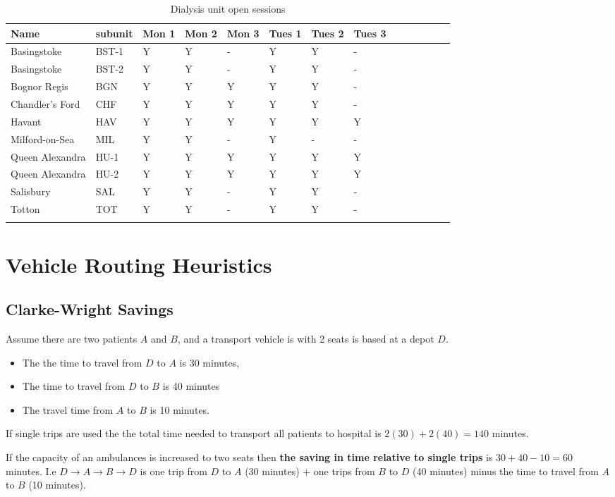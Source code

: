 \begin{appendices}
\begin{minipage}{\textwidth}
\begin{longtable}[]{@{}llllllllllllll@{}}
\caption{Dialysis unit open sessions}\\
\toprule
\endhead
Name & subunit & Mon 1 & Mon 2 & Mon 3 & Tues 1 & Tues 2 & Tues 3\tabularnewline
\midrule
Basingstoke & BST-1 & Y & Y & - & Y & Y & -\tabularnewline
Basingstoke & BST-2 & Y & Y & - & Y & Y & -\tabularnewline
Bognor Regis & BGN & Y & Y & Y & Y & Y & -\tabularnewline
Chandler's Ford & CHF & Y & Y & Y & Y & Y & -\tabularnewline
Havant & HAV & Y & Y & Y & Y & Y & Y\tabularnewline
Milford-on-Sea & MIL & Y & Y & - & Y & - & -\tabularnewline
Queen Alexandra & HU-1 & Y & Y & Y & Y & Y & Y\tabularnewline
Queen Alexandra & HU-2 & Y & Y & Y & Y & Y & Y\tabularnewline
Salisbury & SAL & Y & Y & - & Y & Y & -\tabularnewline
Totton & TOT & Y & Y & - & Y & Y & -\tabularnewline
\bottomrule
\label{tab:dialysis_unit_sessions}
\end{longtable}
\end{minipage}

\section{Vehicle Routing Heuristics}
\label{sec:vrp}

\subsection{Clarke-Wright Savings}

Assume there are two patients $A$ and $B$, and a transport vehicle is with 2 seats is based at a depot $D$. 

\begin{itemize}
    \item The the time to travel from $D$ to $A$ is 30 minutes,
    \item The time to travel from $D$ to $B$ is 40 minutes
    \item The travel time from $A$ to $B$ is 10 minutes.
\end{itemize}

If single trips are used the the total time needed to transport all patients to hospital is $2(30) + 2(40) = 140$ minutes. 

If the capacity of an ambulances is increased to two seats then \textbf{the saving in time relative to single trips} is $ 30 + 40 - 10 = 60$ minutes. I.e $D \rightarrow A \rightarrow B \rightarrow D$ is one trip from $D$ to $A$ (30 minutes) + one trips from $B$ to $D$ (40 minutes) minus the time to travel from $A$ to $B$ (10 minutes).


\end{appendices}
